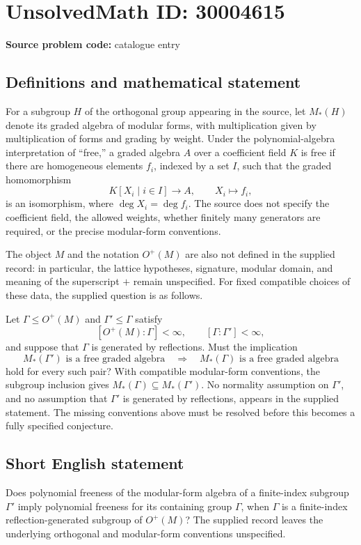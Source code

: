 \documentclass[11pt]{article}
\begin{document}
\section*{UnsolvedMath ID: 30004615}
\textbf{Source problem code:} catalogue entry
\subsection{Definitions and mathematical statement}
For a subgroup \(H\) of the orthogonal group appearing in the source, let \(M_*(H)\) denote its graded algebra of modular forms, with multiplication given by multiplication of forms and grading by weight. Under the polynomial-algebra interpretation of ``free,'' a graded algebra \(A\) over a coefficient field \(K\) is free if there are homogeneous elements \(f_i\), indexed by a set \(I\), such that the graded homomorphism
\[
K[X_i\mid i\in I]\longrightarrow A,\qquad X_i\longmapsto f_i,
\]
is an isomorphism, where \(\deg X_i=\deg f_i\). The source does not specify the coefficient field, the allowed weights, whether finitely many generators are required, or the precise modular-form conventions.

The object \(M\) and the notation \(O^+(M)\) are also not defined in the supplied record: in particular, the lattice hypotheses, signature, modular domain, and meaning of the superscript \(+\) remain unspecified. For fixed compatible choices of these data, the supplied question is as follows.

Let \(\Gamma\leq O^+(M)\) and \(\Gamma'\leq\Gamma\) satisfy
\[
[O^+(M):\Gamma]<\infty,
\qquad [\Gamma:\Gamma']<\infty,
\]
and suppose that \(\Gamma\) is generated by reflections. Must the implication
\[
M_*(\Gamma')\text{ is a free graded algebra}
\quad\Longrightarrow\quad
M_*(\Gamma)\text{ is a free graded algebra}
\]
hold for every such pair? With compatible modular-form conventions, the subgroup inclusion gives \(M_*(\Gamma)\subseteq M_*(\Gamma')\). No normality assumption on \(\Gamma'\), and no assumption that \(\Gamma'\) is generated by reflections, appears in the supplied statement. The missing conventions above must be resolved before this becomes a fully specified conjecture.
\subsection{Short English statement}
Does polynomial freeness of the modular-form algebra of a finite-index subgroup \(\Gamma'\) imply polynomial freeness for its containing group \(\Gamma\), when \(\Gamma\) is a finite-index reflection-generated subgroup of \(O^+(M)\)? The supplied record leaves the underlying orthogonal and modular-form conventions unspecified.
\end{document}
